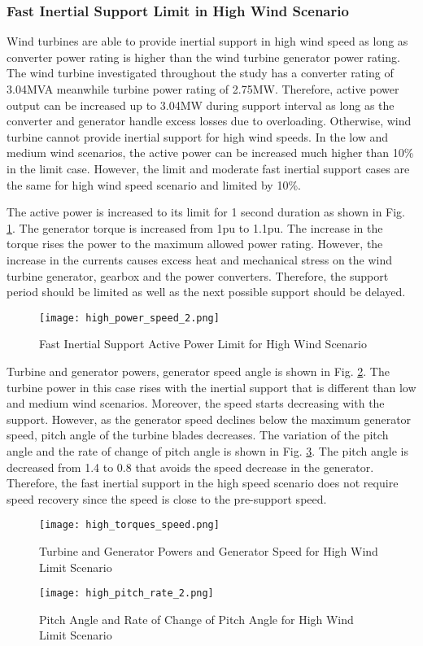 \subsubsection{Fast Inertial Support Limit in High Wind Scenario}
Wind turbines are able to provide inertial support in high wind speed as long as converter power rating is higher than the wind turbine generator power rating. The wind turbine investigated throughout the study has a converter rating of 3.04MVA meanwhile turbine power rating of 2.75MW. Therefore, active power output can be increased up to 3.04MW during support interval as long as the converter and generator handle excess losses due to overloading. Otherwise, wind turbine cannot provide inertial support for high wind speeds. In the low and medium wind scenarios, the active power can be increased much higher than 10\% in the limit case. However, the limit and moderate fast inertial support cases are the same for high wind speed scenario and limited by 10\%.\par
The active power is increased to its limit for 1 second duration as shown in Fig. \ref{high_powers}. The generator torque is increased from 1pu to 1.1pu. The increase in the torque rises the power to the maximum allowed power rating. However, the increase in the currents causes excess heat and mechanical stress on the wind turbine generator, gearbox and the power converters. Therefore, the support period should be limited as well as the next possible support should be delayed. \par
\begin{figure}[h]
	\centering
	\texttt{[image: high\_power\_speed\_2.png]}
	\caption{Fast Inertial Support Active Power Limit for High Wind Scenario}
	\label{high_powers}
\end{figure}
Turbine and generator powers, generator speed angle is shown in Fig. \ref{high_limit_speed}. The turbine power in this case rises with the inertial support that is different than low and medium wind scenarios. Moreover, the speed starts decreasing with the support. However, as the generator speed declines below the maximum generator speed, pitch angle of the turbine blades decreases. 
The variation of the pitch angle and the rate of change of pitch angle is shown in Fig. \ref{pitch_rate}. The pitch angle is decreased from 1.4 to 0.8 that avoids the speed decrease in the generator. Therefore, the fast inertial support in the high speed scenario does not require speed recovery since the speed is close to the pre-support speed. \par
\begin{figure}[h!]
	\centering
	\texttt{[image: high\_torques\_speed.png]}
	\caption{Turbine and Generator Powers and Generator Speed for High Wind Limit Scenario}
	\label{high_limit_speed}
\end{figure}
\begin{figure}[h!]
	\centering
	\texttt{[image: high\_pitch\_rate\_2.png]}
	\caption{Pitch Angle and Rate of Change of Pitch Angle for High Wind Limit Scenario}
	\label{pitch_rate}
\end{figure}
